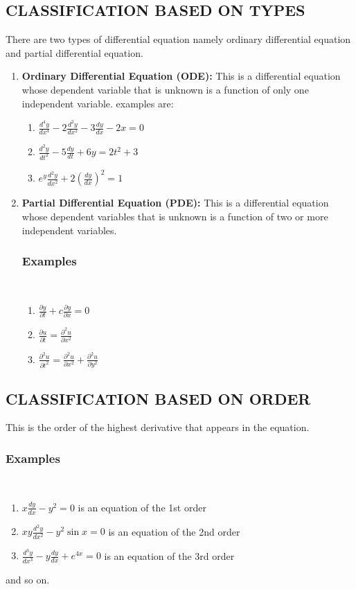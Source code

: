 \documentclass[11pt]{report}
\newcommand{\spn}[1]{\\[#1cm]}
\newcommand{\bt}[1]{\textbf{#1}}
\newcommand{\dsp}{\displaystyle}
\newcommand{\examples}{\subsubsection*{Examples}{~}\spn{-1}}
\begin{document}
	\subsection{CLASSIFICATION BASED ON TYPES}
	There are two types of differential equation namely ordinary differential equation and partial differential equation.
	\begin{enumerate}
		\item \bt{Ordinary Differential Equation (ODE):} This is a differential equation whose dependent variable that is unknown is a function of only one independent variable. examples are:
		\begin{enumerate}
			\item $\dsp \frac{d^4y}{dx^4} - 2\frac{d^2y}{dx^2} - 3\frac{dy}{dx} - 2x = 0$
			\item $\dsp \frac{d^2y}{dt^2} - 5\frac{dy}{dt} + 6y = 2t^2 + 3 $
			\item $\dsp e^y\frac{d^2y}{dx^2} + 2\left(\frac{dy}{dx}\right)^2 = 1$
		\end{enumerate}
		
		\item \bt{Partial Differential Equation (PDE):} This is a differential equation whose dependent variables that is unknown is a function of two or more independent variables.\spn{-1.3}
		\examples
		\begin{enumerate}
			\item $\dsp \frac{\partial y}{\partial t} + c\frac{\partial y}{\partial x} = 0$
			\item $\dsp \frac{\partial u}{\partial t} = \frac{\partial^2 u}{\partial x^2}$
			\item $\dsp \frac{\partial^2 u}{\partial t^2} = \frac{\partial^2 u}{\partial x^2} + \frac{\partial^2 u}{\partial y^2}$
		\end{enumerate}
	\end{enumerate}
	
	\subsection{CLASSIFICATION BASED ON ORDER}
	This is the order of the highest derivative that appears in the equation.\spn{-1.3}
	\examples
	\begin{enumerate}
		\item $\dsp x\frac{dy}{dx} - y^2 = 0$ is an equation of the 1st order
		\item $\dsp xy\frac{d^2y}{dx^2} - y^2\sin x = 0$ is an equation of the 2nd order
		\item $\dsp\frac{d^3y}{dx^3} - y\frac{dy}{dx}+e^{4x} = 0$ is an equation of the 3rd order
	\end{enumerate}
	and so on.
	
\end{document}
